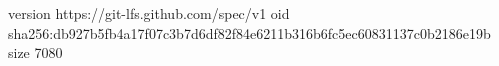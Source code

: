 version https://git-lfs.github.com/spec/v1
oid sha256:db927b5fb4a17f07c3b7d6df82f84e6211b316b6fc5ec60831137c0b2186e19b
size 7080
